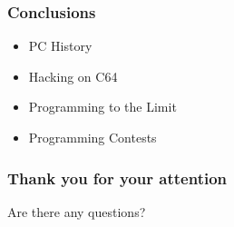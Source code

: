 \documentclass[aspectratio=43]{uva-inf-presentation}
\begin{document}
\begin{frame}
\frametitle{Conclusions}

\begin{itemize}
\item PC History
\item Hacking on C64
\item Programming to the Limit
\item Programming Contests
\end{itemize}

\end{frame}





\begin{frame}
\frametitle{Thank you for your attention}
\Large{\centerline{Are there any questions?}}
\end{frame}
\end{document}
